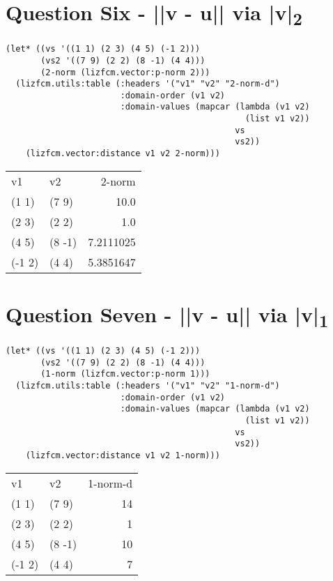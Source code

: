 \documentclass[11pt]{article}
\begin{document}
\section{Question Six - ||v - u|| via |v|\textsubscript{2}}
\label{sec:orge36996c}
\begin{verbatim}
(let* ((vs '((1 1) (2 3) (4 5) (-1 2)))
       (vs2 '((7 9) (2 2) (8 -1) (4 4)))
       (2-norm (lizfcm.vector:p-norm 2)))
  (lizfcm.utils:table (:headers '("v1" "v2" "2-norm-d")
                       :domain-order (v1 v2)
                       :domain-values (mapcar (lambda (v1 v2)
                                                (list v1 v2))
                                              vs
                                              vs2))
    (lizfcm.vector:distance v1 v2 2-norm)))
\end{verbatim}


\begin{center}
\begin{tabular}{llr}
v1 & v2 & 2-norm\\[0pt]
(1 1) & (7 9) & 10.0\\[0pt]
(2 3) & (2 2) & 1.0\\[0pt]
(4 5) & (8 -1) & 7.2111025\\[0pt]
(-1 2) & (4 4) & 5.3851647\\[0pt]
\end{tabular}
\end{center}

\section{Question Seven - ||v - u|| via |v|\textsubscript{1}}
\label{sec:orgd1577f0}
\begin{verbatim}
(let* ((vs '((1 1) (2 3) (4 5) (-1 2)))
       (vs2 '((7 9) (2 2) (8 -1) (4 4)))
       (1-norm (lizfcm.vector:p-norm 1)))
  (lizfcm.utils:table (:headers '("v1" "v2" "1-norm-d")
                       :domain-order (v1 v2)
                       :domain-values (mapcar (lambda (v1 v2)
                                                (list v1 v2))
                                              vs
                                              vs2))
    (lizfcm.vector:distance v1 v2 1-norm)))
\end{verbatim}


\begin{center}
\begin{tabular}{llr}
v1 & v2 & 1-norm-d\\[0pt]
(1 1) & (7 9) & 14\\[0pt]
(2 3) & (2 2) & 1\\[0pt]
(4 5) & (8 -1) & 10\\[0pt]
(-1 2) & (4 4) & 7\\[0pt]
\end{tabular}
\end{center}
\end{document}
